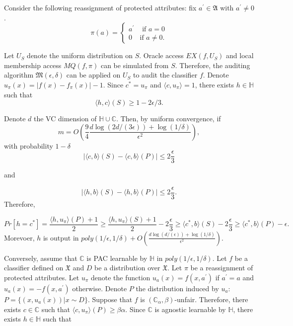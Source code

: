 \documentclass{article}
\begin{document}
Consider the following reassignment of protected attributes: fix $a^{'}\in \mathfrak{A}$ with $a^{'}\neq 0$.
\begin{equation}
    \pi(a) = \begin{cases}
    a^{'} & \mbox{ if } a=0  \\
    0 & \mbox{if } a\neq 0.
    \end{cases}
\end{equation}

Let $U_{S}$ denote the uniform distribution on $S$. Oracle access $EX(f, U_{S})$ and local membership access $MQ(f, \pi)$ can be simulated from $S$. Therefore, the auditing algorithm $\mathfrak{M}(\epsilon, \delta)$ can be applied on $U_{S}$ to audit the classifier $f$. Denote $u_{\pi}(x)=|f(x)-f_{\pi}(x)| -1$. Since $c^{*}=u_{\pi}$ and $\langle c, u_{\pi}\rangle =1$, there exists $h\in \mathbb{H}$ such that $$\langle h, c\rangle(S) \geq 1 -2\epsilon/3.$$ 

\bigskip
Denote $d$ the VC dimension of $\mathbb{H}\cup\mathbb{C}$. Then, by uniform convergence, if $$m=O\left(\frac{9}{4}\frac{d\log(2d/(3\epsilon)) + \log(1/\delta)}{\epsilon^{2}}\right),$$
with probability $1-\delta$
$$|\langle c, b\rangle(S) - \langle c, b\rangle(P)| \leq 2\frac{\epsilon}{3} $$

and

$$|\langle h, b\rangle(S) - \langle h, b\rangle(P)| \leq 2\frac{\epsilon}{3}. $$
Therefore,

$$Pr[h=c^{*}]=\frac{\langle h, u_{\pi}\rangle(P) + 1}{2} \geq \frac{\langle h, u_{\pi}\rangle(S)+ 1}{2} - 2\frac{\epsilon}{3}\geq \langle c^{*}, b\rangle(S) - 2\frac{\epsilon}{3}\geq \langle c^{*}, b\rangle(P) - \epsilon.$$
Morevoer, $h$ is output in $poly(1/\epsilon, 1/\delta) + O\left(\frac{d\log(d/(\epsilon)) + \log(1/\delta)}{\epsilon^{2}}\right)$.

\bigskip
Conversely, assume that $\mathbb{C}$ is PAC learnable by $\mathbb{H}$ in $poly(1/\epsilon, 1/\delta)$. Let $f$ be a classifier defined on $\mathfrak{X}$ and $D$ be a distribution over $\mathfrak{X}$.  Let $\pi$ be a reassignment of protected attributes. Let $u_{\pi}$ denote the function $u_{a}(x)=f(x, a^{'})$ if $a^{'}=a$ and $u_{a}(x)=-f(x,a^{'})$ otherwise. Denote $P$ the distribution induced by $u_{a}$: $P=\{(x, u_{a}(x)) | x\sim D\}$. Suppose that $f$ is $(\mathbb{C}_{\alpha}, \beta)$-unfair. Therefore, there exists $c\in\mathbb{C}$ such that $\langle c, u_{\pi}\rangle (P) \geq \beta\alpha$.  Since $\mathbb{C}$ is agnostic learnable by $\mathbb{H}$, there exists $h\in \mathbb{H}$ such that 
\end{document}
